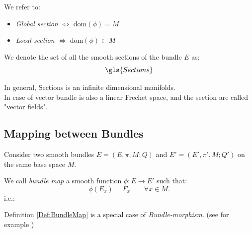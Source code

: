 \documentclass[Main]{subfiles}
\begin{document}
			\begin{notationfix}
				We refer to:
					\begin{itemize}
						\item \emph{Global section} $\Leftrightarrow$ $\textrm{dom}(\phi) = M$
						\item \emph{Local section} $\Leftrightarrow$ $\textrm{dom}(\phi) \subset M$
					\end{itemize}
				We denote the set of all the smooth sections of the bundle $E$  as:
				\begin{displaymath}
					\gls{Sections}
				\end{displaymath}
			\end{notationfix}
			
			\begin{observation}
				In general, \gls{Sections} is an infinite dimensional manifolds. 
				\\
				In case of vector bundle is also a linear Frechet space\cite{Kriegl}, and the section are called "vector fields".
			\end{observation}
			
			
		\subsection{Mapping between Bundles}
			Consider two smooth bundles $E=(E,\pi,M; Q)$ and $E'=(E',\pi',M; Q')$ on the same base space $M$.
			\begin{definition}\label{Def:BundleMap}
				We call \emph{bundle map} a smooth function $\phi: E \rightarrow E'$ such that:			
			 	\begin{displaymath}
			 		\phi(E_{x})= F_{x} \qquad \forall x \in M.
			 	\end{displaymath}
				i.e.:
				
				\centering
			\end{definition}
			\begin{observation}
				Definition \ref{Def:BundleMap} is a special case of \emph{Bundle-morphism}. (see for example \cite{G.Sardanashvily2013})
			\end{observation}
\end{document}
